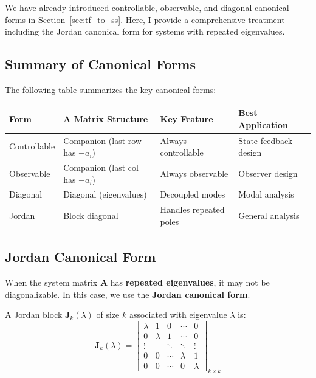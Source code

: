 We have already introduced controllable, observable, and diagonal canonical forms in Section~\ref{sec:tf_to_ss}. Here, I provide a comprehensive treatment including the Jordan canonical form for systems with repeated eigenvalues.

\subsection{Summary of Canonical Forms}

The following table summarizes the key canonical forms:

\begin{center}
\begin{tabular}{p{2.5cm}p{4cm}p{4cm}p{3cm}}
\toprule
\textbf{Form} & \textbf{A Matrix Structure} & \textbf{Key Feature} & \textbf{Best Application} \\
\midrule
Controllable & Companion (last row has $-a_i$) & Always controllable & State feedback design \\
Observable & Companion (last col has $-a_i$) & Always observable & Observer design \\
Diagonal & Diagonal (eigenvalues) & Decoupled modes & Modal analysis \\
Jordan & Block diagonal & Handles repeated poles & General analysis \\
\bottomrule
\end{tabular}
\end{center}

\subsection{Jordan Canonical Form}

When the system matrix $\mathbf{A}$ has \textbf{repeated eigenvalues}, it may not be diagonalizable. In this case, we use the \textbf{Jordan canonical form}.

\begin{definition}
A Jordan block $\mathbf{J}_k(\lambda)$ of size $k$ associated with eigenvalue $\lambda$ is:
\begin{equation}
\mathbf{J}_k(\lambda) = \begin{bmatrix}
\lambda & 1 & 0 & \cdots & 0 \\
0 & \lambda & 1 & \cdots & 0 \\
\vdots & & \ddots & \ddots & \vdots \\
0 & 0 & \cdots & \lambda & 1 \\
0 & 0 & \cdots & 0 & \lambda
\end{bmatrix}_{k \times k}
\end{equation}
\end{definition}

